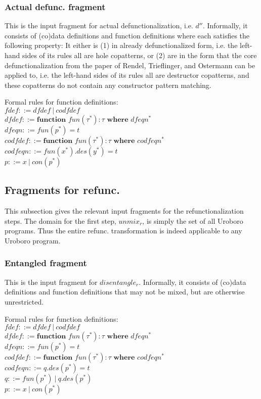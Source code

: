 \documentclass[11pt]{article} %
\begin{document}
\subsubsection{Actual defunc. fragment}

This is the input fragment for actual defunctionalization, i.e. $d''$. Informally, it consists of (co)data definitions and function definitions where each satisfies the following property: It either is (1) in already defunctionalized form, i.e. the left-hand sides of its rules all are hole copatterns, or (2) are in the form that the core defunctionalization from the paper of Rendel, Trieflinger, and Ostermann can be applied to, i.e. the left-hand sides of its rules all are destructor copatterns, and these copatterns do not contain any constructor pattern matching.

Formal rules for function definitions:\\
$fdef ::= dfdef ~ | ~ codfdef$\\
$dfdef ::= \textbf{function } fun(\tau^*): \tau \textbf{ where } dfeqn^*$\\
$dfeqn ::= fun(p^*) = t$\\
$codfdef ::= \textbf{function } fun(\tau^*): \tau \textbf{ where } codfeqn^*$\\
$codfeqn ::= fun(x^*).des(y^*) = t$\\
$p ::= x ~ | ~ con(p^*) $\\

\subsection{Fragments for refunc.}

This subsection gives the relevant input fragments for the refunctionalization steps. The domain for the first step, $unmix_r$, is simply the set of all Uroboro programs. Thus the entire refunc. transformation is indeed applicable to any Uroboro program.

\subsubsection{Entangled fragment}

This is the input fragment for $disentangle_r$. Informally, it consists of (co)data definitions and function definitions that may not be mixed, but are otherwise unrestricted.

Formal rules for function definitions:\\
$fdef ::= dfdef ~ | ~ codfdef$\\
$dfdef ::= \textbf{function } fun(\tau^*): \tau \textbf{ where } dfeqn^*$\\
$dfeqn ::= fun(p^*) = t$\\
$codfdef ::= \textbf{function } fun(\tau^*): \tau \textbf{ where } codfeqn^*$\\
$codfeqn ::= q.des(p^*) = t$\\
$q ::= fun(p^*) ~ | ~ q.des(p^*)$\\
$p ::= x ~ | ~ con(p^*) $\\
\end{document}
